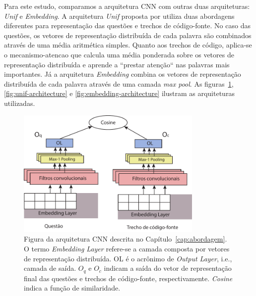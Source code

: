 Para este estudo, comparamos a arquitetura CNN com outras duas arquiteturas: \textit{Unif} e \textit{Embedding}. A arquitetura \textit{Unif} proposta por \cite{cambronero-deep-learning-code-search:2019} utiliza duas abordagens diferentes para representação das questões e trechos de código-fonte. No caso das questões, os vetores de representação distribuída de cada palavra são combinados através de uma média aritmética simples. Quanto aos trechos de código, aplica-se o \gls{mecanismo-atencao} que calcula uma média ponderada sobre os vetores de representação distribuída e aprende a ``prestar atenção`` nas palavras mais importantes.  Já a arquitetura \textit{Embedding} combina os vetores de representação distribuída de cada palavra através de uma camada \textit{max pool}. As figuras~\ref{fig:cnn-architecture}, \ref{fig:unif-architecture} e \ref{fig:embedding-architecture} ilustram as arquiteturas utilizadas.
\begin{figure}[h]
    \centering
    \includegraphics[width=0.8\textwidth]{figuras/cap-experimento/cnn-architecture-proposal.pdf}
    \caption{Figura da arquitetura CNN descrita no Capítulo~\ref{cap:abordagem}. O termo \emph{Embedding Layer} refere-se a camada composta por vetores de representação distribuída. OL é o acrônimo de \emph{Output Layer}, i.e., camada de saída. $O_{q}$ e $O_{c}$ indicam a saída do vetor de representação final das questões e trechos de código-fonte, respectivamente. \emph{Cosine} indica a função de similaridade.}
    \label{fig:cnn-architecture}
\end{figure}

